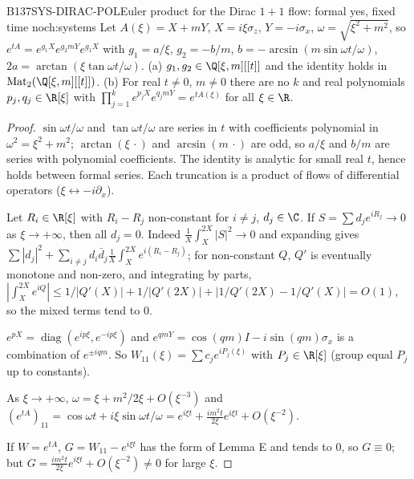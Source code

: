 \begin{dimcard}{B137}{SYS-DIRAC-POL}{Euler product for the Dirac $1{+}1$ flow: formal yes, fixed time no}{\pw}{ch:systems}
Let $A(\xi)=X+mY$, $X=i\xi\sigma_z$, $Y=-i\sigma_x$, $\omega=\sqrt{\xi^2+m^2}$, so $e^{tA}=e^{g_1X}e^{g_2mY}e^{g_1X}$ with $g_1=a/\xi$, $g_2=-b/m$, $b=-\arcsin(m\sin\omega t/\omega)$, $2a=\arctan(\xi\tan\omega t/\omega)$. (a) $g_1,g_2\in\Q[\xi,m][[t]]$ and the identity holds in $\mathrm{Mat}_2(\Q[\xi,m][[t]])$. (b) For real $t\ne0$, $m\ne0$ there are no $k$ and real polynomials $p_j,q_j\in\R[\xi]$ with $\prod_{j=1}^ke^{p_jX}e^{q_jmY}=e^{tA(\xi)}$ for all $\xi\in\R$.
\end{dimcard}

\begin{proof}
$\sin\omega t/\omega$ and $\tan\omega t/\omega$ are series in $t$ with coefficients polynomial in $\omega^2=\xi^2+m^2$; $\arctan(\xi\,\cdot)$ and $\arcsin(m\,\cdot)$ are odd, so $a/\xi$ and $b/m$ are series with polynomial coefficients. The identity is analytic for small real $t$, hence holds between formal series. Each truncation is a product of flows of differential operators ($\xi\leftrightarrow-i\partial_x$).

Let $R_i\in\R[\xi]$ with $R_i-R_j$ non-constant for $i\ne j$, $d_j\in\C$. If $S=\sum d_je^{iR_j}\to0$ as $\xi\to+\infty$, then all $d_j=0$. Indeed $\frac1X\int_X^{2X}|S|^2\to0$ and expanding gives $\sum|d_j|^2+\sum_{i\ne j}d_i\bar d_j\frac1X\int_X^{2X}e^{i(R_i-R_j)}$; for non-constant $Q$, $Q'$ is eventually monotone and non-zero, and integrating by parts, $|\int_X^{2X}e^{iQ}|\le1/|Q'(X)|+1/|Q'(2X)|+|1/Q'(2X)-1/Q'(X)|=O(1)$, so the mixed terms tend to $0$.

$e^{pX}=\operatorname{diag}(e^{ip\xi},e^{-ip\xi})$ and $e^{qmY}=\cos(qm)I-i\sin(qm)\sigma_x$ is a combination of $e^{\pm iqm}$. So $W_{11}(\xi)=\sum c_je^{iP_j(\xi)}$ with $P_j\in\R[\xi]$ (group equal $P_j$ up to constants).

As $\xi\to+\infty$, $\omega=\xi+m^2/2\xi+O(\xi^{-3})$ and $(e^{tA})_{11}=\cos\omega t+i\xi\sin\omega t/\omega=e^{i\xi t}+\frac{im^2t}{2\xi}e^{i\xi t}+O(\xi^{-2})$.

If $W=e^{tA}$, $G=W_{11}-e^{i\xi t}$ has the form of Lemma E and tends to $0$, so $G\equiv0$; but $G=\frac{im^2t}{2\xi}e^{i\xi t}+O(\xi^{-2})\ne0$ for large $\xi$.

\end{proof}

